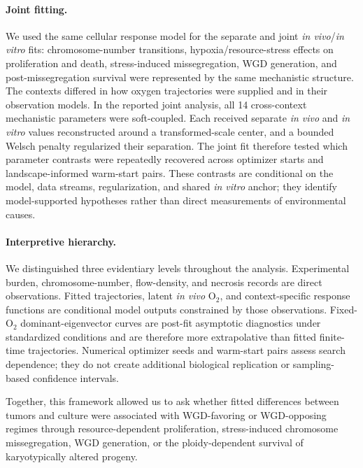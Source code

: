 \documentclass[11pt]{article}
\begin{document}
\paragraph{Joint fitting.}
We used the same cellular response model for the separate and joint \textit{in vivo}/\textit{in vitro} fits: chromosome-number transitions, hypoxia/resource-stress effects on proliferation and death, stress-induced missegregation, WGD generation, and post-missegregation survival were represented by the same mechanistic structure. The contexts differed in how oxygen trajectories were supplied and in their observation models. In the reported joint analysis, all 14 cross-context mechanistic parameters were soft-coupled. Each received separate \textit{in vivo} and \textit{in vitro} values reconstructed around a transformed-scale center, and a bounded Welsch penalty regularized their separation. The joint fit therefore tested which parameter contrasts were repeatedly recovered across optimizer starts and landscape-informed warm-start pairs. These contrasts are conditional on the model, data streams, regularization, and shared \textit{in vitro} anchor; they identify model-supported hypotheses rather than direct measurements of environmental causes.

\paragraph{Interpretive hierarchy.}
We distinguished three evidentiary levels throughout the analysis. Experimental burden, chromosome-number, flow-density, and necrosis records are direct observations. Fitted trajectories, latent \textit{in vivo} O$_2$, and context-specific response functions are conditional model outputs constrained by those observations. Fixed-O$_2$ dominant-eigenvector curves are post-fit asymptotic diagnostics under standardized conditions and are therefore more extrapolative than fitted finite-time trajectories. Numerical optimizer seeds and warm-start pairs assess search dependence; they do not create additional biological replication or sampling-based confidence intervals.

Together, this framework allowed us to ask whether fitted differences between tumors and culture were associated with WGD-favoring or WGD-opposing regimes through resource-dependent proliferation, stress-induced chromosome missegregation, WGD generation, or the ploidy-dependent survival of karyotypically altered progeny.
\end{document}
